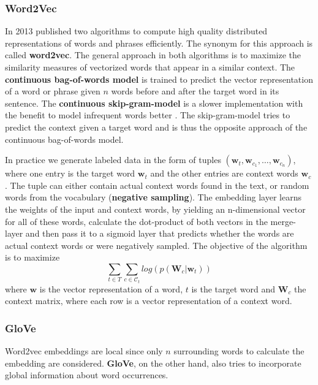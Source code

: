 \subsubsection{Word2Vec}
In 2013 \citeauthor{Mikolov2013} published two algorithms to compute high quality distributed representations of words and phrases efficiently. The synonym for this approach is called \textbf{word2vec}. The general approach in both algorithms is to maximize the similarity measures of vectorized words that appear in a similar context. The \textbf{continuous bag-of-words model} is trained to predict the vector representation of a word or phrase given $n$ words before and after the target word in its sentence. The \textbf{continuous skip-gram-model} is a slower implementation with the benefit to model infrequent words better \citep{word2vec}. The skip-gram-model tries to predict the context given a target word and is thus the opposite approach of the continuous bag-of-words model.

In practice we generate labeled data in the form of tuples $(\mathbf{w}_t, \mathbf{w}_{c_{1}}, \dots, \mathbf{w}_{c_{n}})$, where one entry is the target word $\mathbf{w}_t$ and the other entries are context words $\mathbf{w}_c$. The tuple can either contain actual context words found in the text, or random words from the vocabulary (\textbf{negative sampling}). The embedding layer learns the weights of the input and context words, by yielding an n-dimensional vector for all of these words, calculate the dot-product of both vectors in the merge-layer and then pass it to a sigmoid layer that predicts whether the words are actual context words or were negatively sampled. The objective of the algorithm is to maximize
    \[\sum_{t \in T} \sum_{c \in \mathcal{C}_t} log( p(\mathbf{W}_c|\mathbf{w}_t))\]
    where $\mathbf{w}$ is the vector representation of a word, $t$ is the target word and $\mathbf{W}_c$ the context matrix, where each row is a vector representation of a context word.

\subsubsection{GloVe}
Word2vec embeddings are local since only $n$ surrounding words to calculate the embedding are considered. \textbf{GloVe}, on the other hand, also tries to incorporate global information about word occurrences.

